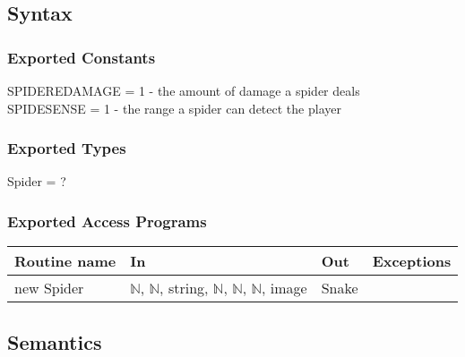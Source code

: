 \documentclass[12pt]{article}
\begin{document}
\subsection*{Syntax}

\subsubsection*{Exported Constants}

SPIDEREDAMAGE = 1 - the amount of damage a spider deals\\
SPIDESENSE = 1 - the range a spider can detect the player

\subsubsection*{Exported Types}

Spider = ?

\subsubsection*{Exported Access Programs}

\begin{tabular}{| l | l | l | l | }
\hline
\textbf{Routine name} & \textbf{In} & \textbf{Out} & \textbf{Exceptions}\\
\hline
new Spider & $\mathbb{N}$, $\mathbb{N}$, string, $\mathbb{N}$, $\mathbb{N}$, $\mathbb{N}$, image & Snake & ~\\
\hline
\end{tabular}

\subsection*{Semantics}


\end{document}
